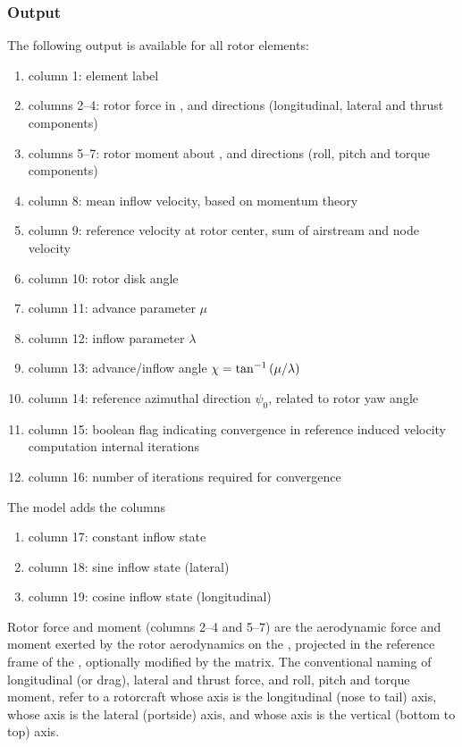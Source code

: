 \subsubsection{Output}
The following output is available for all rotor elements:
\begin{enumerate}
\item column 1: element label
\item columns 2--4: rotor force in ,  and  directions
	(longitudinal, lateral and thrust components)
\item columns 5--7: rotor moment about ,  and  directions
	(roll, pitch and torque components)
\item column 8: mean inflow velocity, based on momentum theory
\item column 9: reference velocity at rotor center, sum of airstream
	and  node velocity
\item column 10: rotor disk angle
\item column 11: advance parameter $\mu$
\item column 12: inflow parameter $\lambda$
\item column 13: advance/inflow angle $\chi=\tan^{-1}\left( \mu/\lambda \right)$
\item column 14: reference azimuthal direction $\psi_0$,
	related to rotor yaw angle
\item column 15: boolean flag indicating convergence
	in reference induced velocity computation internal iterations
\item column 16: number of iterations required for convergence
\setcounter{elem_rotor_output}{\value{enumi}}
\end{enumerate}
The  model adds the columns
\begin{enumerate}
\setcounter{enumi}{\value{elem_rotor_output}}
\item column 17: constant inflow state
\item column 18: sine inflow state (lateral)
\item column 19: cosine inflow state (longitudinal)
\end{enumerate}
Rotor force and moment (columns 2--4 and 5--7) are the aerodynamic
force and moment exerted by the rotor aerodynamics on the ,
projected in the reference frame of the ,
optionally modified by the  matrix.
The conventional naming of longitudinal (or drag), lateral and thrust force,
and roll, pitch and torque moment, refer to a rotorcraft
whose  axis is the longitudinal (nose to tail) axis,
whose  axis is the lateral (portside) axis,
and whose  axis is the vertical (bottom to top) axis.

